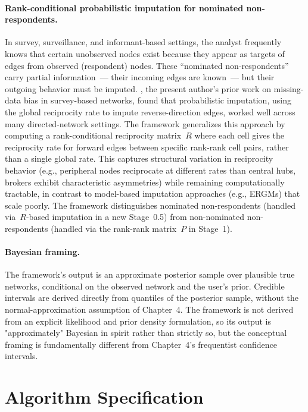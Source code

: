 \documentclass[11pt]{article}
\newcommand{\Rmat}{R}
\newcommand{\Pmat}{P}
\begin{document}
\paragraph{Rank-conditional probabilistic imputation for nominated non-respondents.} In survey, surveillance, and informant-based settings, the analyst frequently knows that certain unobserved nodes exist because they appear as targets of edges from observed (respondent) nodes. These ``nominated non-respondents'' carry partial information~--- their incoming edges are known~--- but their outgoing behavior must be imputed. \citet{SmithMorganMoody2022}, the present author's prior work on missing-data bias in survey-based networks, found that probabilistic imputation, using the global reciprocity rate to impute reverse-direction edges, worked well across many directed-network settings. The framework generalizes this approach by computing a rank-conditional reciprocity matrix~$\Rmat$ where each cell gives the reciprocity rate for forward edges between specific rank-rank cell pairs, rather than a single global rate. This captures structural variation in reciprocity behavior (e.g., peripheral nodes reciprocate at different rates than central hubs, brokers exhibit characteristic asymmetries) while remaining computationally tractable, in contrast to model-based imputation approaches (e.g., ERGMs) that scale poorly. The framework distinguishes nominated non-respondents (handled via~$\Rmat$-based imputation in a new Stage~0.5) from non-nominated non-respondents (handled via the rank-rank matrix~$\Pmat$ in Stage~1).

\paragraph{Bayesian framing.} The framework's output is an approximate posterior sample over plausible true networks, conditional on the observed network and the user's prior. Credible intervals are derived directly from quantiles of the posterior sample, without the normal-approximation assumption of Chapter~4. The framework is not derived from an explicit likelihood and prior density formulation, so its output is "approximately" Bayesian in spirit rather than strictly so, but the conceptual framing is fundamentally different from Chapter~4's frequentist confidence intervals.

\section{Algorithm Specification}
\end{document}
